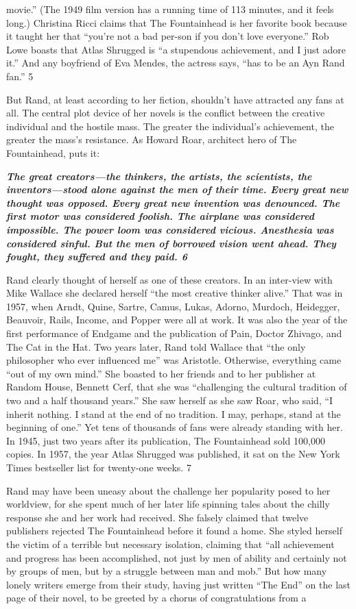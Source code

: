 movie.” (The 1949 film version has a running time of {\color{blue} 113 } minutes, and it feels long.) Christina Ricci claims that The Fountainhead is her favorite book because it taught her that “you’re not a bad per-son if you don’t love everyone.” Rob Lowe boasts that Atlas Shrugged is “a stupendous achievement, and I just adore it.” And any boyfriend of Eva Mendes, the actress says, “has to be an Ayn Rand fan.” {\color{blue} 5 } {\par} But Rand, at least according to her fiction, shouldn’t have attracted any fans at all. The central plot device of her novels is the conflict between the creative individual and the hostile mass. The greater the individual’s achievement, the greater the mass’s resistance. As Howard Roar, architect hero of The Fountainhead, puts it:{\par} {\textbf{\textit{The great creators—the thinkers, the artists, the scientists, the inventors—stood alone against the men of their time. Every great new thought was opposed. Every great new invention was denounced. The first motor was considered foolish. The airplane was considered impossible. The power loom was considered vicious. Anesthesia was considered sinful. But the men of borrowed vision went ahead. They fought, they suffered and they paid. {\color{blue} 6 } } } }{\par} Rand clearly thought of herself as one of these creators. In an inter-view with Mike Wallace she declared herself “the most creative thinker alive.” That was in 1957, when Arndt, Quine, Sartre, Camus, Lukas, Adorno, Murdoch, Heidegger, Beauvoir, Rails, Income, and Popper were all at work. It was also the year of the first performance of Endgame and the publication of Pain, Doctor Zhivago, and The Cat in the Hat. Two years later, Rand told Wallace that “the only philosopher who ever influenced me” was Aristotle. Otherwise, everything came “out of my own mind.” She boasted to her friends and to her publisher at Random House, Bennett Cerf, that she was “challenging the cultural tradition of two and a half thousand years.” She saw herself as she saw Roar, who said, “I inherit nothing. I stand at the end of no tradition. I may, perhaps, stand at the beginning of one.” Yet tens of thousands of fans were already standing with her. In 1945, just two years after its publication, The Fountainhead sold 100,000 copies. In 1957, the year Atlas Shrugged was published, it sat on the New York Times bestseller list for twenty-one weeks. {\color{blue} 7 } {\par} Rand may have been uneasy about the challenge her popularity posed to her worldview, for she spent much of her later life spinning tales about the chilly response she and her work had received. She falsely claimed that twelve publishers rejected The Fountainhead before it found a home. She styled herself the victim of a terrible but necessary isolation, claiming that “all achievement and progress has been accomplished, not just by men of ability and certainly not by groups of men, but by a struggle between man and mob.” But how many lonely writers emerge from their study, having just written “The End” on the last page of their novel, to be greeted by a chorus of congratulations from a 